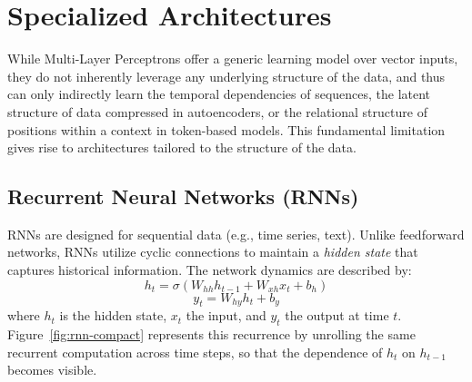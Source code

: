 \section{Specialized Architectures}
\label{sec:specialized_architectures}

While Multi-Layer Perceptrons offer a generic learning model over vector inputs, they do not inherently leverage any underlying structure of the data, and thus can only indirectly learn the temporal dependencies of sequences, the latent structure of data compressed in autoencoders, or the relational structure of positions within a context in token-based models. This fundamental limitation gives rise to architectures tailored to the structure of the data.

\subsection{Recurrent Neural Networks (RNNs)}
RNNs are designed for sequential data (e.g., time series, text). Unlike feedforward networks, RNNs utilize cyclic connections to maintain a \textit{hidden state} that captures historical information. The network dynamics are described by:
\[
h_t = \sigma(W_{hh} h_{t-1} + W_{xh} x_t + b_h)
\]
\[
y_t = W_{hy} h_t + b_y
\]
where \( h_t \) is the hidden state, \( x_t \) the input, and \( y_t \) the output at time \( t \).
Figure~\ref{fig:rnn-compact} represents this recurrence by unrolling the same recurrent computation across time steps, so that the dependence of $h_t$ on $h_{t-1}$ becomes visible.
